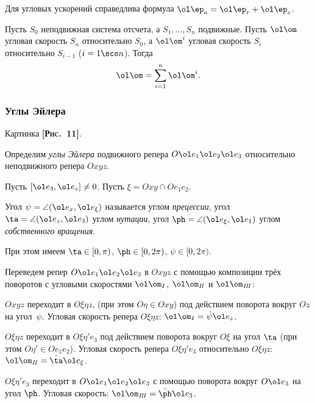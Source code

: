 \documentclass[a4paper,12pt]{article}
\def\w{\ol\om}
\def\e{\ol e}
\def\vep{\ol\ep}
\def\d{\dot}
\def\pic#1{ \hbox{\textbf{\textsc{[Рис.~#1]}}}}
\begin{document}
\begin{imp}
Для угловых ускорений справедлива формула $\vep_a=\vep_r+\vep_e$.
\end{imp}

\begin{imp}\label{imp:angleSpeed}
Пусть $S_0$ неподвижная система отсчета, а
$S_1,\dots, S_n$ подвижные. Пусть $\w$ угловая скорость $S_n$
относительно $S_0$, а $\w^i$ угловая скорость $S_i$ относительно
$S_{i-1}$ ($i=1\sco n$). Тогда $$\w=\sum_{i=1}^n\w^i.$$
\end{imp}

\subsubsection{Углы Эйлера}

Картинка \pic{11}.

Определим \emph{углы Эйлера} подвижного репера $O\e_1\e_2\e_3$ относительно
неподвижного репера $Oxyz$.

Пусть $[\e_3,\e_z]\ne0$.
Пусть $\xi=Oxy\cap Oe_1e_2$.

\begin{df}
Угол $\psi=\angle(\e_x,\e_\xi)$ называется углом \emph{прецессии},
угол $\ta=\angle(\e_z,\e_3)$ углом \emph{нутации},
угол $\ph=\angle(\e_\xi,\e_1)$ углом \emph{собственного вращения}.
\end{df}

При этом имеем $\ta\in[0,\pi)$, $\ph\in[0,2\pi)$, $\psi\in[0,2\pi)$.

Переведем репер $O\e_1\e_2\e_3$ в $Oxyz$ с помощью композиции трёх поворотов
с угловыми скоростями $\w_I$, $\w_{I\!I}$ и $\w_{I\!I\!I}$:

\begin{points}{-2}
\item $Oxyz$ переходит в $O\xi\eta z$, (при этом $O\eta\in Oxy$) под
      действием поворота вокруг $Oz$ на угол~$\psi$. Угловая скорость
      репера $O\xi\eta z$: $\w_{I}=\d\psi\e_z$.
\item $O\xi\eta z$ переходит в $O\xi\eta'e_3$ под действием поворота вокруг
      $O\xi$ на угол $\ta$ (при этом $O\eta'\in Oe_1e_2$). Угловая скорость
      репера $O\xi\eta'e_3$ относительно $O\xi\eta z$:
      $\w_{I\!I}=\d\ta\e_\xi$.
\item $O\xi\eta'e_3$ переходит в $O\e_1\e_2\e_3$ с помощью поворота вокруг $O\e_3$
      на угол $\ph$. Угловая скорость: $\w_{I\!I\!I}=\d\ph\e_3$.
\end{points}
\end{document}
